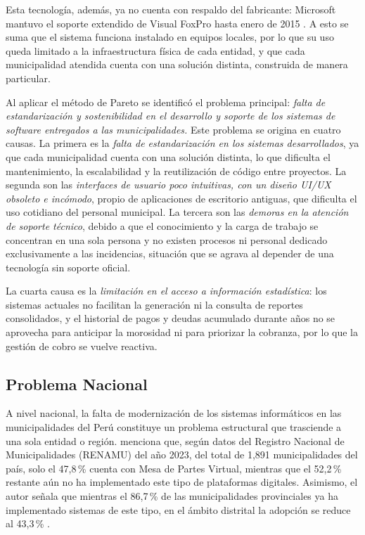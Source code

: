 \documentclass[12pt,a4paper]{report}
\begin{document}
Esta tecnología, además, ya no cuenta con respaldo del fabricante: Microsoft mantuvo el soporte extendido de Visual FoxPro hasta enero de 2015 \parencite{taft2007}. A esto se suma que el sistema funciona instalado en equipos locales, por lo que su uso queda limitado a la infraestructura física de cada entidad, y que cada municipalidad atendida cuenta con una solución distinta, construida de manera particular.

Al aplicar el método de Pareto se identificó el problema principal: \textit{falta de estandarización y sostenibilidad en el desarrollo y soporte de los sistemas de software entregados a las municipalidades.} Este problema se origina en cuatro causas. La primera es la \textit{falta de estandarización en los sistemas desarrollados}, ya que cada municipalidad cuenta con una solución distinta, lo que dificulta el mantenimiento, la escalabilidad y la reutilización de código entre proyectos. La segunda son las \textit{interfaces de usuario poco intuitivas, con un diseño UI/UX obsoleto e incómodo}, propio de aplicaciones de escritorio antiguas, que dificulta el uso cotidiano del personal municipal. La tercera son las \textit{demoras en la atención de soporte técnico}, debido a que el conocimiento y la carga de trabajo se concentran en una sola persona y no existen procesos ni personal dedicado exclusivamente a las incidencias, situación que se agrava al depender de una tecnología sin soporte oficial.

La cuarta causa es la \textit{limitación en el acceso a información estadística}: los sistemas actuales no facilitan la generación ni la consulta de reportes consolidados, y el historial de pagos y deudas acumulado durante años no se aprovecha para anticipar la morosidad ni para priorizar la cobranza, por lo que la gestión de cobro se vuelve reactiva. %

\subsection{Problema Nacional}

A nivel nacional, la falta de modernización de los sistemas informáticos en las municipalidades del Perú constituye un problema estructural que trasciende a una sola entidad o región. \textcite{francoulco2026} menciona que, según datos del Registro Nacional de Municipalidades (RENAMU) del año 2023, del total de 1,891 municipalidades del país, solo el 47,8\,\% cuenta con Mesa de Partes Virtual, mientras que el 52,2\,\% restante aún no ha implementado este tipo de plataformas digitales. Asimismo, el autor señala que mientras el 86,7\,\% de las municipalidades provinciales ya ha implementado sistemas de este tipo, en el ámbito distrital la adopción se reduce al 43,3\,\% \parencite{francoulco2026}.
\end{document}
